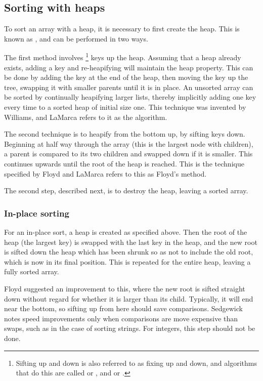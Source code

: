 \subsection{Sorting with heaps}
To sort an array with a heap, it is necessary to first create the heap. This is
known as , and can be performed in two ways.

The first method involves \footnote{Sifting up and down is also
referred to as fixing up and down, and algorithms that do this are called
 or , and  or .} keys up the heap.
Assuming that a heap already exists, adding a key and re-heapifying will
maintain the heap property. This can be done by adding the key at the end of
the heap, then moving the key up the tree, swapping it with smaller parents
until it is in place. An unsorted array can be sorted by continually heapifying
larger lists, thereby implicitly adding one key every time to a sorted heap of
initial size one. This technique was invented by Williams, and LaMarca refers to
it as the  algorithm.

The second technique is to heapify from the bottom up, by sifting keys down.
Beginning at half way through the array (this is the largest node with children),
a parent is compared to its two children and swapped down if it is smaller. This
continues upwards until the root of the heap is reached. This is the technique
specified by Floyd and LaMarca refers to this as Floyd's method.

The second step, described next, is to destroy the heap, leaving a sorted array.

\subsubsection{In-place sorting}
For an in-place sort, a heap is created as specified above. Then the root of the
heap (the largest key) is swapped with the last key in the heap, and the new
root is sifted down the heap which has been shrunk so as not to include the old
root, which is now in its final position. This is repeated for the entire heap,
leaving a fully sorted array.

Floyd suggested an improvement to this, where the new root is sifted straight
down without regard for whether it is larger than its child. Typically, it will
end near the bottom, so sifting up from here should save comparisons. Sedgewick
notes speed improvements only when comparisons are move expensive than swaps,
such as in the case of sorting strings. For integers, this step should not be
done.

